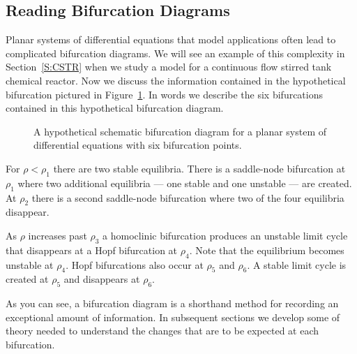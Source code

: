 \documentclass{ximera}
\begin{document}
\subsection*{Reading Bifurcation Diagrams}

Planar systems of differential equations that model applications often
lead to complicated bifurcation diagrams.  We will see an example
of this complexity in Section~\ref{S:CSTR} when we study a model for a 
continuous flow stirred tank chemical reactor.  
Now we discuss the information contained in the hypothetical bifurcation 
pictured in Figure~\ref{F:hypo}. In words we describe the six bifurcations
contained in this hypothetical bifurcation diagram. 

\begin{figure}[htb]
           \centerline{%
           }
  	   \caption{A hypothetical schematic bifurcation diagram for a planar 
	  system of differential equations with six bifurcation points.} 
           \label{F:hypo}
\end{figure}

For $\rho<\rho_1$
there are two stable equilibria.  There is a saddle-node bifurcation 
at $\rho_1$ where two additional equilibria --- one stable and one 
unstable --- are created.  At $\rho_2$ there is a second saddle-node 
bifurcation where two of the four equilibria disappear.  

As $\rho$ increases past $\rho_3$ a homoclinic 
bifurcation produces an
unstable limit cycle that disappears at a 
Hopf bifurcation at $\rho_4$.  
Note that the equilibrium becomes unstable at $\rho_4$.
Hopf bifurcations also occur at $\rho_5$ and $\rho_6$.   A stable
limit cycle is created at $\rho_5$ and disappears at $\rho_6$.

As you can see, a  bifurcation diagram is a shorthand method for recording
an exceptional amount of information.  In subsequent sections we develop 
some of theory needed to understand the changes that are to be expected 
at each bifurcation.  

\EXER

\TEXER
\end{document}
